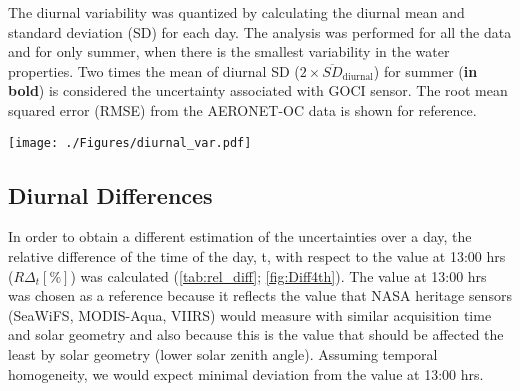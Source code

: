 \documentclass[remotesensing,article,submit,moreauthors,pdftex,10pt,a4paper]{Definitions/mdpi}
\begin{document}
  \begin{table}[htbp!]
  \caption{The diurnal variability was quantized by calculating the diurnal mean and standard deviation (SD) for each day. The analysis was performed for all the data and for only summer, when there is the smallest variability in the water properties. Two times the mean of diurnal SD ($2\times \overline{SD}_\text{diurnal}$) for summer (\textbf{in bold}) is considered the uncertainty associated with GOCI sensor. The root mean squared error (RMSE) from the AERONET-OC data is shown for reference. \label{tab:diurnal_var} } 
  \centering
  \texttt{[image: ./Figures/diurnal\_var.pdf]}
  \end{table}

\subsection{Diurnal Differences}
In order to obtain a different estimation of the uncertainties over a day, the relative difference of the time of the day, t, with respect to the value at 13:00 hrs ($R\Delta_t[\%]$) was calculated (\autoref{tab:rel_diff}; \autoref{fig:Diff4th}). The value at 13:00 hrs was chosen as a reference because it reflects the value that NASA heritage sensors (SeaWiFS, MODIS-Aqua, VIIRS) would measure with similar acquisition time and solar geometry and also because this is the value that should be affected the least by solar geometry (lower solar zenith angle). Assuming temporal homogeneity, we would expect minimal deviation from the value at 13:00 hrs. 
\end{document}
